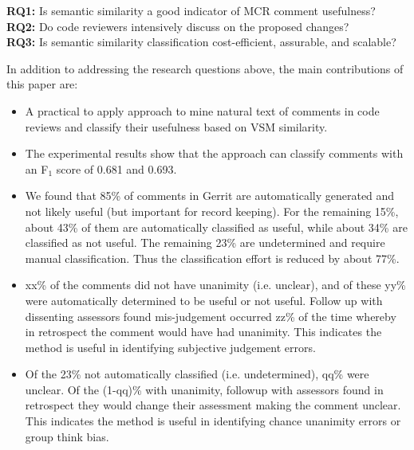 \noindent \textbf{RQ1:} Is semantic similarity a good indicator of MCR comment usefulness?\\
\noindent \textbf{RQ2:} Do code reviewers intensively discuss on the proposed changes?\\
\noindent \textbf{RQ3:} Is semantic similarity classification cost-efficient, assurable, and scalable?

\noindent In addition to addressing the research questions above, the main contributions of this paper are:
\begin{itemize}
\item A practical to apply approach to mine natural text of comments in code reviews and classify their usefulness based on VSM similarity.
\item The experimental results show that the approach can classify comments with an F$_1$ score of 0.681 and 0.693.
\item We found that 85\% of comments in Gerrit are automatically generated and not likely useful (but important for record keeping). For the remaining 15\%, about 43\% of them are automatically classified as useful, while about 34\% are classified as not useful. The remaining 23\% are undetermined and require manual classification. Thus the classification effort is reduced by about 77\%.
\item xx\% of the comments did not have unanimity (i.e. unclear), and of these yy\% were automatically determined to be useful or not useful. Follow up with dissenting assessors found mis-judgement occurred zz\% of the time whereby in retrospect the comment would have had unanimity. This indicates the method is useful in identifying subjective judgement errors. 
\item Of the 23\% not automatically classified (i.e. undetermined), qq\% were unclear. Of the (1-qq)\% with unanimity, followup with assessors found in retrospect they would change their assessment making the comment unclear. This indicates the method is useful in identifying chance unanimity errors or group think bias.
\end{itemize} 

